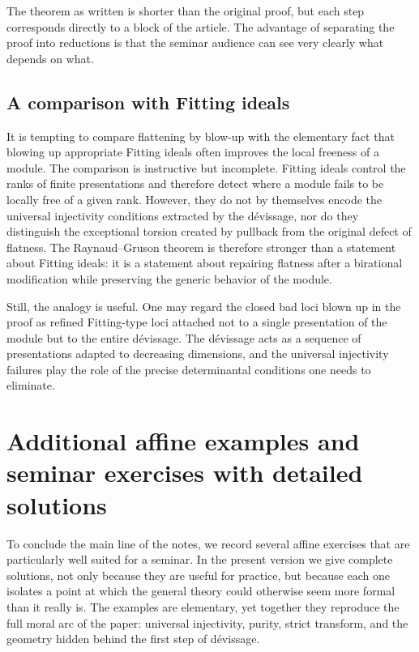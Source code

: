 \documentclass[11pt,oneside]{article}
\begin{document}
The theorem as written is shorter than the original proof, but each step corresponds directly to a block of the article.  The advantage of separating the proof into reductions is that the seminar audience can see very clearly what depends on what.

\subsection{A comparison with Fitting ideals}

It is tempting to compare flattening by blow-up with the elementary fact that blowing up appropriate Fitting ideals often improves the local freeness of a module.  The comparison is instructive but incomplete.  Fitting ideals control the ranks of finite presentations and therefore detect where a module fails to be locally free of a given rank.  However, they do not by themselves encode the universal injectivity conditions extracted by the d\'evissage, nor do they distinguish the exceptional torsion created by pullback from the original defect of flatness.  The Raynaud--Gruson theorem is therefore stronger than a statement about Fitting ideals: it is a statement about repairing flatness after a birational modification while preserving the generic behavior of the module.

Still, the analogy is useful.  One may regard the closed bad loci blown up in the proof as refined Fitting-type loci attached not to a single presentation of the module but to the entire d\'evissage.  The d\'evissage acts as a sequence of presentations adapted to decreasing dimensions, and the universal injectivity failures play the role of the precise determinantal conditions one needs to eliminate.


\section{Additional affine examples and seminar exercises with detailed solutions}

To conclude the main line of the notes, we record several affine exercises that are particularly well suited for a seminar.  In the present version we give complete solutions, not only because they are useful for practice, but because each one isolates a point at which the general theory could otherwise seem more formal than it really is.  The examples are elementary, yet together they reproduce the full moral arc of the paper: universal injectivity, purity, strict transform, and the geometry hidden behind the first step of d\'evissage.
\end{document}
